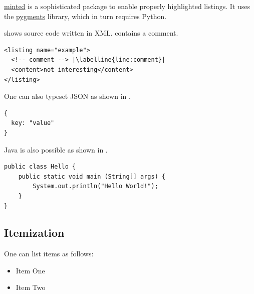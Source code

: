 \href{https://github.com/gpoore/minted}{minted} is a sophisticated package to enable properly highlighted listings.
It uses the \href{http://pygments.org/}{pygments} library, which in turn requires Python.

\begin{ltgexample}
 shows source code written in XML.
 contains a comment.

\begin{listing}[htbp]
  \begin{verbatim}
<listing name="example">
  <!-- comment --> |\labelline{line:comment}|
  <content>not interesting</content>
</listing>
\end{verbatim}
  \caption{Example XML listing using minted}
  \label{lst:XML}
\end{listing}
\end{ltgexample}

One can also typeset JSON as shown in .

\begin{ltgexample}
\begin{listing}[htbp]
  \begin{verbatim}
{
  key: "value"
}
\end{verbatim}
  \caption{Example JSON listing using minted}
  \label{lst:flJSON}
\end{listing}
\end{ltgexample}

Java is also possible as shown in .

\begin{ltgexample}
\begin{listing}[htbp]
  \begin{verbatim}
public class Hello {
    public static void main (String[] args) {
        System.out.println("Hello World!");
    }
}
\end{verbatim}
  \caption{Java code rendered using minted}
  \label{lst:flJava}
\end{listing}
\end{ltgexample}

\subsection{Itemization}

One can list items as follows:

\begin{ltgexample}
\begin{itemize}
  \item Item One
  \item Item Two
\end{itemize}
\end{ltgexample}


